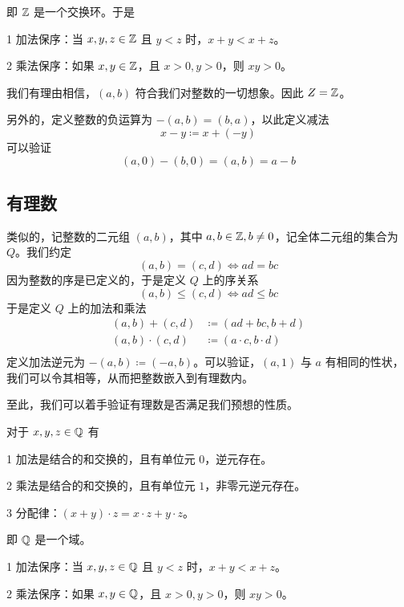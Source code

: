 即 $\ZZ$ 是一个交换环。于是

\begin{theorem}[$\ZZ$ 是有序域]
	\num{1} 加法保序：当 $x,y,z\in \mathbb{Z}$ 且 $y<z$ 时，$x+y<x+z$。

	\num{2} 乘法保序：如果 $x,y\in \mathbb{Z}$，且 $x>0,y>0$，则 $xy>0$。
\end{theorem}

我们有理由相信，$(a,b)$ 符合我们对整数的一切想象。因此 $Z = \mathbb{Z}$。

另外的，定义整数的负运算为 $-(a,b) = (b,a)$，以此定义减法
$$x - y \coloneqq  x + (-y)$$
可以验证
$$(a,0) - (b,0) = (a,b) = a - b$$

\subsection{有理数}

类似的，记整数的二元组 $(a,b)$，其中 $a,b\in \mathbb{Z},b\ne 0$，记全体二元组的集合为 $Q$。我们约定
$$(a,b) = (c,d) \Leftrightarrow ad = bc$$
因为整数的序是已定义的，于是定义 $Q$ 上的序关系
$$(a,b) \leqslant (c,d) \Leftrightarrow ad \leqslant bc$$
于是定义 $Q$ 上的加法和乘法
\begin{equation*}
	\begin{aligned}
		(a,b) + (c,d) &\coloneqq  (ad+bc,b+d)\\
		(a,b) \cdot (c,d) &\coloneqq  (a \cdot c,b \cdot d)\\
	\end{aligned}
\end{equation*}
定义加法逆元为 $-(a,b) \coloneqq  (-a,b)$。可以验证，$(a,1)$ 与 $a$ 有相同的性状，我们可以令其相等，从而把整数嵌入到有理数内。

至此，我们可以着手验证有理数是否满足我们预想的性质。

\begin{theorem}[$\QQ$ 的代数算律]
	对于 $x,y,z\in \mathbb{Q}$ 有

	\num{1} 加法是结合的和交换的，且有单位元 $0$，逆元存在。

	\num{2} 乘法是结合的和交换的，且有单位元 $1$，非零元逆元存在。

	\num{3} 分配律：$(x+y) \cdot  z = x \cdot z + y\cdot z$。
\end{theorem}

即 $\QQ$ 是一个域。

\begin{theorem}[$\QQ$ 是有序域]
	\num{1} 加法保序：当 $x,y,z\in \mathbb{Q}$ 且 $y<z$ 时，$x+y<x+z$。

	\num{2} 乘法保序：如果 $x,y\in \mathbb{Q}$，且 $x>0,y>0$，则 $xy>0$。
\end{theorem}

